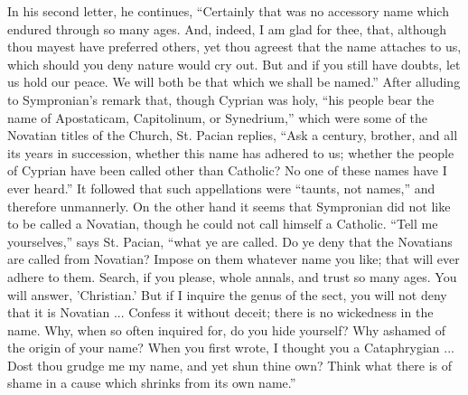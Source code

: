 In his second letter, he continues, ``Certainly
that was no accessory name which endured through so many
ages. And, indeed, I am glad for thee, that, although
thou mayest have preferred others, yet thou agreest that
the name attaches to us, which should you deny nature
would cry out. But and if you still have doubts, let us
hold our peace. We will both be that which we shall be
named.'' After alluding to Sympronian's remark that,
though Cyprian was holy, ``his people bear the name
of Apostaticam, Capitolinum, or Synedrium,'' which
were some of the Novatian titles of the Church, St.
Pacian replies, ``Ask a century, brother, and all its
years in succession, whether this name has adhered to us;
whether the people of Cyprian have been called other than
Catholic? No one of these names have I ever heard.''
It followed that such appellations were ``taunts, not
names,'' and therefore unmannerly. On the other hand
it seems that Sympronian did not like to be called a
Novatian, though he could not call himself a Catholic.
``Tell me yourselves,'' says St. Pacian,
``what ye are called. Do ye deny that the Novatians
are called from Novatian? Impose on them whatever name
you like; that will ever adhere to them. Search, if you
please, whole annals, and trust so many ages. You will
answer, 'Christian.' But if I inquire the genus of the
sect, you will not deny that it is Novatian ... Confess
it without deceit; there is no wickedness in the name.
Why, when so often inquired for, do you hide yourself?
Why ashamed of the origin of your name? When you first
wrote, I thought you a Cataphrygian ... Dost thou grudge
me my name, and yet shun thine own? Think what there is
of shame in a cause which shrinks from its own
name.''

